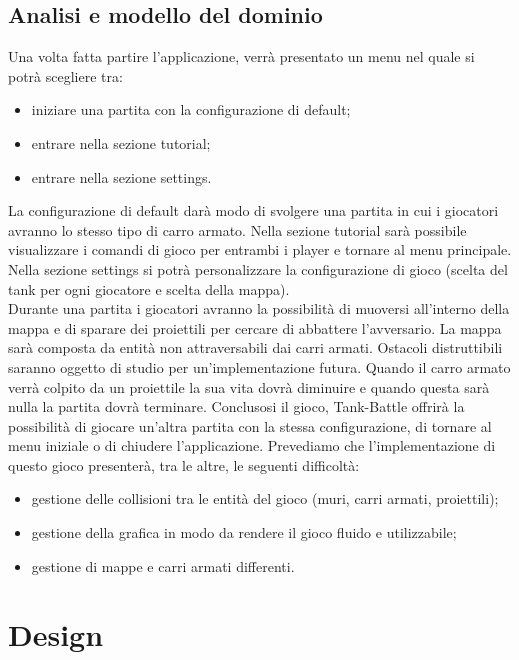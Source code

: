 \documentclass[a4paper,12pt]{report}
\begin{document}
\section{Analisi e modello del dominio}
Una volta fatta partire l’applicazione, verrà presentato un menu nel quale si potrà scegliere tra:
\begin{itemize}
	\item iniziare una partita con la configurazione di default;
	\item entrare nella sezione tutorial;
	\item entrare nella sezione settings.
\end{itemize}
La configurazione di default darà modo di svolgere una partita in cui i giocatori avranno lo stesso tipo di carro armato.
Nella sezione tutorial sarà possibile visualizzare i comandi di gioco per entrambi i player e tornare al menu principale.
Nella sezione settings si potrà personalizzare la configurazione di gioco (scelta del tank per ogni giocatore e scelta della mappa).\\
Durante una partita i giocatori avranno la possibilità di muoversi all’interno della mappa e di sparare dei proiettili per cercare di abbattere l’avversario.
La mappa sarà composta da entità non attraversabili dai carri armati.
Ostacoli distruttibili saranno oggetto di studio per un’implementazione futura.
Quando il carro armato verrà colpito da un proiettile la sua vita dovrà diminuire e quando questa sarà nulla la partita dovrà terminare.
Conclusosi il gioco, Tank-Battle offrirà la possibilità di giocare un’altra partita con la stessa configurazione, di tornare al menu iniziale o di chiudere l’applicazione.
Prevediamo che l’implementazione di questo gioco presenterà, tra le altre, le seguenti difficoltà:
\begin{itemize}
	\item gestione delle collisioni tra le entità del gioco (muri, carri armati, proiettili);
	\item gestione della grafica in modo da rendere il gioco fluido e utilizzabile;
	\item gestione di mappe e carri armati differenti.
\end{itemize}
%
\chapter{Design}
\end{document}
